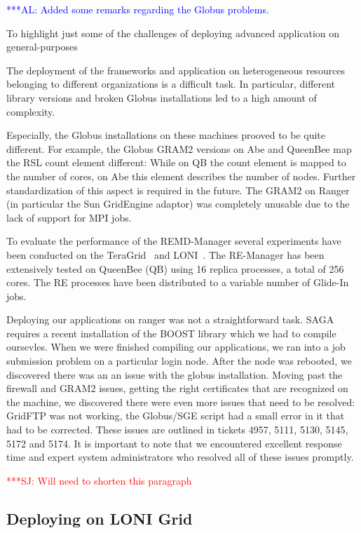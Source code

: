 \documentclass[conference,final]{IEEEtran}
\newcommand{\alnote}[1]{ {\textcolor{blue} { ***AL: #1 }}}
\newcommand{\jhanote}[1]{ {\textcolor{red} { ***SJ: #1 }}}
\newcommand{\alnote}[1]{}
\newcommand{\jhanote}[1]{}
\begin{document}
\alnote{Added some remarks regarding the Globus problems.}

To highlight just some of the challenges of deploying advanced
application on general-purposes 

The deployment of the frameworks and application on heterogeneous
resources belonging to different organizations is a difficult task. In
particular, different library versions and broken Globus installations
led to a high amount of complexity.

Especially, the Globus installations on these machines prooved to be
quite different.  For example, the Globus GRAM2 versions on Abe and
QueenBee map the RSL count element different: While on QB the count
element is mapped to the number of cores, on Abe this element
describes the number of nodes. Further standardization of this aspect
is required in the future. The GRAM2 on Ranger (in particular the Sun
GridEngine adaptor) was completely unusable due to the lack of support
for MPI jobs.

To evaluate the performance of the REMD-Manager several experiments
have been conducted on the TeraGrid~\cite{teragrid} and
LONI~\cite{loni}. The RE-Manager has been extensively tested on
QueenBee (QB) using 16 replica processes, a total of 256 cores.  The
RE processes have been distributed to a variable number of Glide-In
jobs.

Deploying our applications on ranger was not a straightforward task.
SAGA requires a recent installation of the BOOST library which we had
to compile oursevles. When we were finished compiling our
applications, we ran into a job submission problem on a particular
login node. After the node was rebooted, we discovered there was an an
issue with the globus installation. Moving past the firewall and GRAM2
issues, getting the right certificates that are recognized on the
machine, we discovered there were even more issues that need to be
resolved: GridFTP was not working, the Globus/SGE script had a small
error in it that had to be corrected. These issues are outlined in
tickets 4957, 5111, 5130, 5145, 5172 and 5174. It is important to note
that we encountered excellent response time and expert system
administrators who resolved all of these issues promptly.

\jhanote{Will need to shorten this paragraph}

\subsection{Deploying on LONI Grid}
\end{document}
